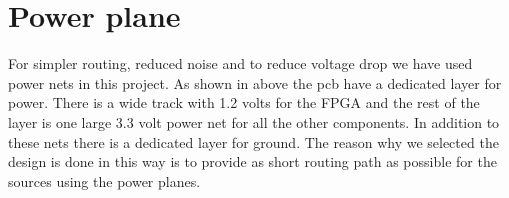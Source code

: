 \section {Power plane}


For simpler routing, reduced noise and to reduce voltage drop we have used power nets in this project.
As shown in above the pcb have a dedicated layer for power.
There is a wide track with 1.2 volts for the FPGA and the rest of the layer is one large 3.3 volt power net for all the other components.
In addition to these nets there is a dedicated layer for ground. The reason why we selected the design is done in this way is to provide as short routing path as possible for the sources using the power planes.

